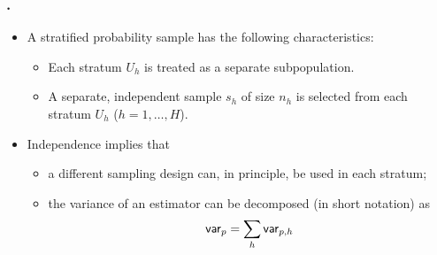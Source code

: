 \documentclass{my_eth_beamer}
\numberwithin{equation}{section}
\begin{document}
\begin{frame}
    \frametitle{\insertsectionnumber.\insertsubsectionnumber~\insertsubsection}
    \begin{itemize}
    \setlength{\itemsep}{12pt}
        \item A \alert{stratified} probability sample has the following
            \alert{characteristics}:
        \vspace{0.25em}
        \begin{itemize}
        \setlength{\itemsep}{8pt}
            \item Each stratum $U_h$ is treated as a \alert{separate
                subpopulation}.
            \item A \alert{separate}, \alert{independent sample} $s_h$ of size
                $n_h$ is selected from each stratum $U_h$ ($h = 1, \ldots, H$).
        \end{itemize}
        \item Independence implies that
        \vspace{0.25em}
        \begin{itemize}
        \setlength{\itemsep}{8pt}
            \item a \alert{different} sampling design can, in principle, be
                used in each stratum;
            \item the \alert{variance} of an estimator can be
                \alert{decomposed} (in short notation) as
                \begin{equation*}
                    \mathsf{var}_p = \sum_h \mathsf{var}_{p,h}
                \end{equation*}
        \end{itemize}
    \end{itemize}
\end{frame}
\end{document}
